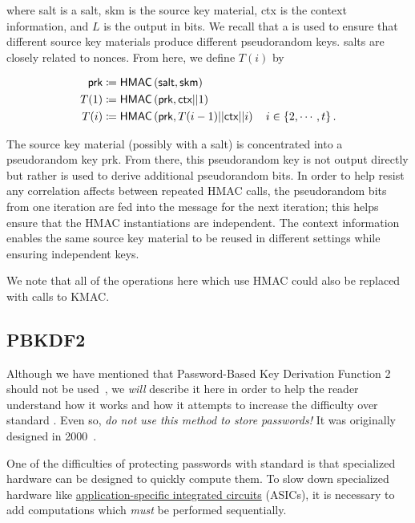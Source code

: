 \noindent
where \textsf{salt} is a \gls{salt},
\textsf{skm} is the source key material,
\textsf{ctx} is the context information, and $L$ is the output in bits.
We recall that a  is used to ensure
that different source key materials produce different pseudorandom keys.
\Glspl{salt} are closely related to \glspl{nonce}.
From here, we define $T(i)$ by

\begin{align}
    \textsf{prk} &\coloneqq{} \textsf{HMAC}\left( \textsf{salt},\textsf{skm} \right)
            \nonumber\\
    T(1) &\coloneqq{} \textsf{HMAC}\left( \textsf{prk}, \textsf{ctx}||1 \right)
            \nonumber\\
    T(i) &\coloneqq{} \textsf{HMAC}\left( \textsf{prk},T(i-1)||
        \textsf{ctx}||i \right) \quad i\in\left\{ 2,\cdots,t \right\}.
\end{align}

\noindent
The source key material (possibly with a \gls{salt}) is concentrated
into a pseudorandom key \textsf{prk}.
From there, this pseudorandom key is not output directly
but rather is used to derive additional pseudorandom bits.
In order to help resist any correlation affects between repeated
\textsf{HMAC} calls,
the pseudorandom bits from one iteration are fed into
the message for the next iteration;
this helps ensure that the \textsf{HMAC} instantiations
are independent.
The context information enables the same source key material
to be reused in different settings while ensuring
independent keys.

We note that all of the operations here which use \textsf{HMAC}
could also be replaced with calls to \textsf{KMAC}.


\subsection{PBKDF2}
\label{app:crypto_pbkdf2}

Although we have mentioned that
Password-Based Key Derivation Function 2~\cite{rfc8018}
should not be used~\cite{blocki2018economics},
we \emph{will} describe it here in order to help the reader understand
how it works and how it attempts to increase the difficulty
over standard .
Even so, \emph{do not use this method to store passwords!}
It was originally designed in 2000~\cite{rfc2898}.

One of the difficulties of protecting passwords with standard
 is that specialized hardware
can be designed to quickly compute them.
To slow down specialized hardware like
\href{https://en.wikipedia.org/wiki/Application-specific_integrated_circuit}{application-specific
integrated circuits} (ASICs),
it is necessary to add computations
which \emph{must} be performed sequentially.

